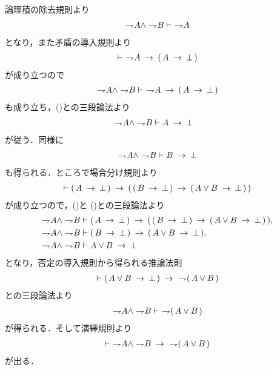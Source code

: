 	\begin{prf}
		論理積の除去規則より
		\begin{align}
			\negation A \wedge \negation B \vdash\ \negation A
			\label{fom:weak_De_Morgan_law_1_1}
		\end{align}
		となり，また矛盾の導入規則より
		\begin{align}
			\vdash\ \negation A \rarrow (\, A \rarrow \bot\, )
		\end{align}
		が成り立つので
		\begin{align}
			\negation A \wedge \negation B 
			\vdash\ \negation A \rarrow (\, A \rarrow \bot\, )
		\end{align}
		も成り立ち，()との三段論法より
		\begin{align}
			\negation A \wedge \negation B &\vdash A \rarrow \bot
			\label{fom:weak_De_Morgan_law_1_2}
		\end{align}
		が従う．同様に
		\begin{align}
			\negation A \wedge \negation B \vdash B \rarrow \bot
			\label{fom:weak_De_Morgan_law_1_3}
		\end{align}
		も得られる．ところで場合分け規則より
		\begin{align}
			\vdash (\, A \rarrow \bot\, ) \rarrow (\, (\, B \rarrow \bot\, )
			\rarrow (\, A \vee B \rarrow \bot\, )\, )
		\end{align}
		が成り立つので，()と
		()との三段論法より
		\begin{align}
			\negation A \wedge \negation B &\vdash (\, A \rarrow \bot\, ) 
			\rarrow (\, (\, B \rarrow \bot\, ) 
			\rarrow (\, A \vee B \rarrow \bot\, )\, ), \\
			\negation A \wedge \negation B &\vdash (\, B \rarrow \bot\, ) 
			\rarrow (\, A \vee B \rarrow \bot\, ), \\
			\negation A \wedge \negation B &\vdash A \vee B \rarrow \bot
		\end{align}
		となり，否定の導入規則から得られる推論法則
		\begin{align}
			\vdash (\, A \vee B \rarrow \bot\, ) \rarrow\ \negation (\, A \vee B\, )
		\end{align}
		との三段論法より
		\begin{align}
			\negation A \wedge \negation B \vdash\ \negation (\, A \vee B\, ) 
		\end{align}
		が得られる．そして演繹規則より
		\begin{align}
			\vdash\ \negation A \wedge \negation B
				\rarrow\ \negation (\, A \vee B\, )
		\end{align}
		が出る．
		\QED
	\end{prf}
	
